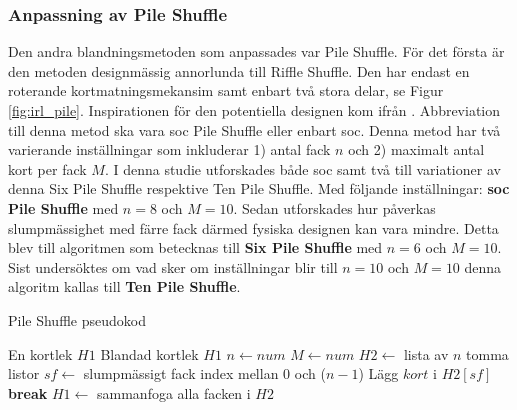 \documentclass[swedish,a4paper]{article}
\begin{document}


\subsubsection{Anpassning av Pile Shuffle}
Den andra blandningsmetoden som anpassades var Pile Shuffle.
För det första är den metoden designmässig 
annorlunda till Riffle Shuffle. Den har endast en roterande
kortmatningsmekansim samt enbart två stora delar, se Figur
\ref{fig:irl_pile}. Inspirationen för den potentiella designen 
kom ifrån
\textcite{3DprintedLife2021}. Abbreviation till denna  metod 
ska vara \gls{soc} Pile Shuffle eller enbart 
\gls{soc}. Denna metod har två varierande inställningar som 
inkluderar 1) antal fack $n$ och 2) maximalt antal kort per
fack $M$. I denna studie utforskades både \gls{soc} samt 
två till variationer av denna Six Pile Shuffle respektive 
Ten Pile Shuffle. Med följande inställningar:
\textbf{\gls{soc} Pile Shuffle} med $n = 8$ och $M = 10$. Sedan utforskades hur påverkas slumpmässighet med färre fack
därmed fysiska designen kan vara mindre. Detta blev till 
algoritmen som betecknas till 
\textbf{Six Pile Shuffle} med $n = 6$ och $M = 10$. Sist undersöktes om vad sker om inställningar blir till $n = 10$ och $M = 10$ denna algoritm kallas till
\textbf{Ten Pile Shuffle}.

\begin{algorithm}
\caption{Pile Shuffle pseudokod}
\label{alg:pile}
\begin{algorithmic}[1]
\Require En kortlek $H1$
\Ensure Blandad kortlek $H1$ 
\State $n \gets num$ 
\State $M \gets num $ 
\State $H2 \gets$ lista av $n$ tomma listor %
    \Loop
        \State $sf \gets$ slumpmässigt fack index mellan $0$ och ($n-1$) 
            \State Lägg $kort$ i $H2[sf]$
            \State \textbf{break}
        \EndIf
    \EndLoop
\EndFor
\State $H1 \gets$ sammanfoga alla facken i $H2$ 
\end{algorithmic}
\end{algorithm}
\end{document}
